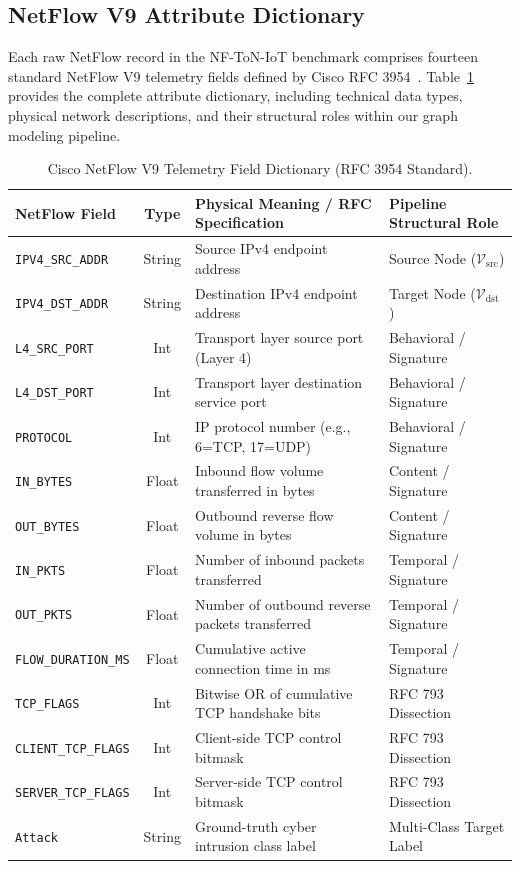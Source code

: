 \documentclass[12pt,a4paper]{report}
\begin{document}
\subsection{NetFlow V9 Attribute Dictionary}
Each raw NetFlow record in the NF-ToN-IoT benchmark comprises fourteen standard NetFlow V9 telemetry fields defined by Cisco RFC 3954~\cite{claise2004netflow}. Table~\ref{tab:netflow_dictionary} provides the complete attribute dictionary, including technical data types, physical network descriptions, and their structural roles within our graph modeling pipeline.

\begin{table}[H]
\centering
\caption{Cisco NetFlow V9 Telemetry Field Dictionary (RFC 3954 Standard).}
\label{tab:netflow_dictionary}
\begin{tabularx}{\textwidth}{l c X l}
\toprule
\textbf{NetFlow Field} & \textbf{Type} & \textbf{Physical Meaning / RFC Specification} & \textbf{Pipeline Structural Role} \\
\midrule
\texttt{IPV4\_SRC\_ADDR} & String & Source IPv4 endpoint address & Source Node ($\mathcal{V}_{\text{src}}$) \\
\texttt{IPV4\_DST\_ADDR} & String & Destination IPv4 endpoint address & Target Node ($\mathcal{V}_{\text{dst}}$) \\
\texttt{L4\_SRC\_PORT} & Int & Transport layer source port (Layer 4) & Behavioral / Signature \\
\texttt{L4\_DST\_PORT} & Int & Transport layer destination service port & Behavioral / Signature \\
\texttt{PROTOCOL} & Int & IP protocol number (e.g., 6=TCP, 17=UDP) & Behavioral / Signature \\
\texttt{IN\_BYTES} & Float & Inbound flow volume transferred in bytes & Content / Signature \\
\texttt{OUT\_BYTES} & Float & Outbound reverse flow volume in bytes & Content / Signature \\
\texttt{IN\_PKTS} & Float & Number of inbound packets transferred & Temporal / Signature \\
\texttt{OUT\_PKTS} & Float & Number of outbound reverse packets transferred & Temporal / Signature \\
\texttt{FLOW\_DURATION\_MS} & Float & Cumulative active connection time in ms & Temporal / Signature \\
\texttt{TCP\_FLAGS} & Int & Bitwise OR of cumulative TCP handshake bits & RFC 793 Dissection \\
\texttt{CLIENT\_TCP\_FLAGS} & Int & Client-side TCP control bitmask & RFC 793 Dissection \\
\texttt{SERVER\_TCP\_FLAGS} & Int & Server-side TCP control bitmask & RFC 793 Dissection \\
\texttt{Attack} & String & Ground-truth cyber intrusion class label & Multi-Class Target Label \\
\bottomrule
\end{tabularx}
\end{table}
\end{document}
